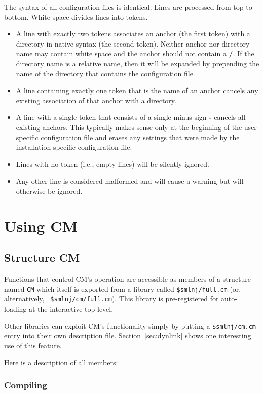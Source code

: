 \documentclass[titlepage,letterpaper]{article}
\begin{document}
The syntax of all configuration files is identical.  Lines are
processed from top to bottom. White space divides lines into tokens.
\begin{itemize}
\item A line with exactly two tokens associates an anchor (the first
token) with a directory in native syntax (the second token).  Neither
anchor nor directory name may contain white space and the anchor
should not contain a {\bf /}.  If the directory name is a relative
name, then it will be expanded by prepending the name of the directory
that contains the configuration file.
\item A line containing exactly one token that is the name of an
anchor cancels any existing association of that anchor with a
directory.
\item A line with a single token that consists of a single minus sign
{\bf -} cancels all existing anchors.  This typically makes sense only
at the beginning of the user-specific configuration file and
erases any settings that were made by the installation-specific
configuration file.
\item Lines with no token (i.e., empty lines) will be silently ignored.
\item Any other line is considered malformed and will cause a warning
but will otherwise be ignored.
\end{itemize}

\section{Using CM}

\subsection{Structure CM}
\label{sec:api}

Functions that control CM's operation are accessible as members of a
structure named {\tt CM} which itself is exported from a library
called {\tt \$smlnj/full.cm} (or, alternatively, {\tt
\$smlnj/cm/full.cm}).  This library is pre-registered for auto-loading
at the interactive top level.

Other libraries can exploit CM's functionality simply by putting a
{\tt \$smlnj/cm.cm} entry into their own description file.
Section~\ref{sec:dynlink} shows one interesting use of this feature.

Here is a description of all members:

\subsubsection{Compiling}
\label{sec:api:compiling}
\end{document}
